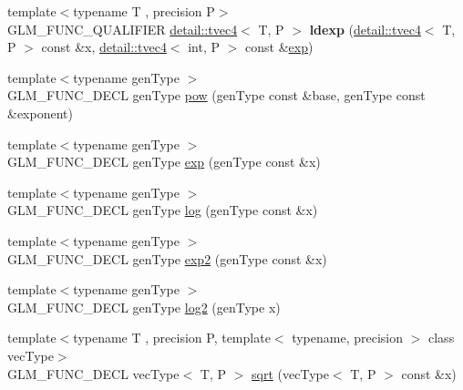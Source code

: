 \begin{DoxyCompactItemize}
\item 
{\footnotesize template$<$typename T , precision P$>$ }\\G\+L\+M\+\_\+\+F\+U\+N\+C\+\_\+\+Q\+U\+A\+L\+I\+F\+I\+ER \hyperlink{structglm_1_1detail_1_1tvec4}{detail\+::tvec4}$<$ T, P $>$ {\bfseries ldexp} (\hyperlink{structglm_1_1detail_1_1tvec4}{detail\+::tvec4}$<$ T, P $>$ const \&x, \hyperlink{structglm_1_1detail_1_1tvec4}{detail\+::tvec4}$<$ int, P $>$ const \&\hyperlink{group__core__func__exponential_gae154699ba6bda068d4b87cf9b987381f}{exp})\hypertarget{namespaceglm_a996ba8bb1830a08ebc28317b6dc71523}{}\label{namespaceglm_a996ba8bb1830a08ebc28317b6dc71523}

\item 
{\footnotesize template$<$typename gen\+Type $>$ }\\G\+L\+M\+\_\+\+F\+U\+N\+C\+\_\+\+D\+E\+CL gen\+Type \hyperlink{group__core__func__exponential_ga1ce4b2fddd26d0d3a35a8d98f37f3ac0}{pow} (gen\+Type const \&base, gen\+Type const \&exponent)
\item 
{\footnotesize template$<$typename gen\+Type $>$ }\\G\+L\+M\+\_\+\+F\+U\+N\+C\+\_\+\+D\+E\+CL gen\+Type \hyperlink{group__core__func__exponential_gae154699ba6bda068d4b87cf9b987381f}{exp} (gen\+Type const \&x)
\item 
{\footnotesize template$<$typename gen\+Type $>$ }\\G\+L\+M\+\_\+\+F\+U\+N\+C\+\_\+\+D\+E\+CL gen\+Type \hyperlink{group__core__func__exponential_ga0c8da2d2921da250e8700ac4476916a1}{log} (gen\+Type const \&x)
\item 
{\footnotesize template$<$typename gen\+Type $>$ }\\G\+L\+M\+\_\+\+F\+U\+N\+C\+\_\+\+D\+E\+CL gen\+Type \hyperlink{group__core__func__exponential_gac45997fb3ac907cad408d6da0a0f5f54}{exp2} (gen\+Type const \&x)
\item 
{\footnotesize template$<$typename gen\+Type $>$ }\\G\+L\+M\+\_\+\+F\+U\+N\+C\+\_\+\+D\+E\+CL gen\+Type \hyperlink{group__core__func__exponential_gad41e336e9bc8190fe99d2cfd9261c19b}{log2} (gen\+Type x)
\item 
{\footnotesize template$<$typename T , precision P, template$<$ typename, precision $>$ class vec\+Type$>$ }\\G\+L\+M\+\_\+\+F\+U\+N\+C\+\_\+\+D\+E\+CL vec\+Type$<$ T, P $>$ \hyperlink{group__core__func__exponential_ga2ea6c6738ad6e09ec3405a628047801b}{sqrt} (vec\+Type$<$ T, P $>$ const \&x)
\item 

\end{DoxyCompactItemize}
